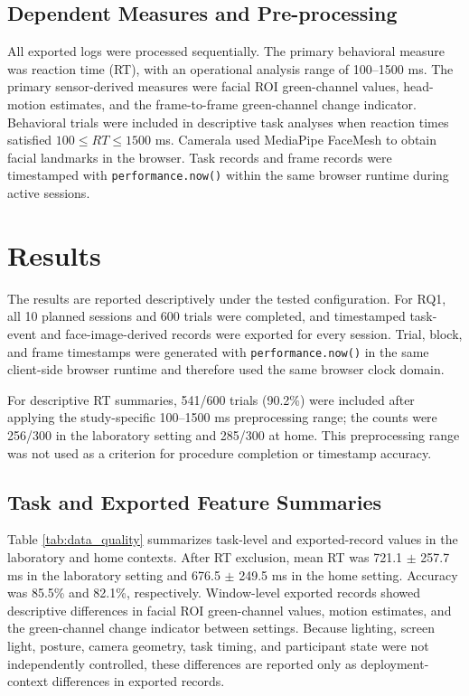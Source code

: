 \documentclass[dvipdfmx]{ehis}
\begin{document}
\subsection{Dependent Measures and Pre-processing}
All exported logs were processed sequentially.
The primary behavioral measure was reaction time (RT), with an operational analysis range of 100--1500 ms.
The primary sensor-derived measures were facial ROI green-channel values, head-motion estimates, and the frame-to-frame green-channel change indicator.
Behavioral trials were included in descriptive task analyses when reaction times satisfied $100 \leq RT \leq 1500$ ms.
Camerala used MediaPipe FaceMesh to obtain facial landmarks in the browser.
Task records and frame records were timestamped with \texttt{performance.now()} within the same browser runtime during active sessions.

\section{Results}

The results are reported descriptively under the tested configuration.
For RQ1, all 10 planned sessions and 600 trials were completed, and timestamped task-event and face-image-derived records were exported for every session.
Trial, block, and frame timestamps were generated with \texttt{performance.now()} in the same client-side browser runtime and therefore used the same browser clock domain.

For descriptive RT summaries, 541/600 trials (90.2\%) were included after applying the study-specific 100--1500 ms preprocessing range; the counts were 256/300 in the laboratory setting and 285/300 at home.
This preprocessing range was not used as a criterion for procedure completion or timestamp accuracy.

\subsection{Task and Exported Feature Summaries}
Table \ref{tab:data_quality} summarizes task-level and exported-record values in the laboratory and home contexts.
After RT exclusion, mean RT was 721.1 $\pm$ 257.7 ms in the laboratory setting and 676.5 $\pm$ 249.5 ms in the home setting.
Accuracy was 85.5\% and 82.1\%, respectively.
Window-level exported records showed descriptive differences in facial ROI green-channel values, motion estimates, and the green-channel change indicator between settings.
Because lighting, screen light, posture, camera geometry, task timing, and participant state were not independently controlled, these differences are reported only as deployment-context differences in exported records.
\end{document}
